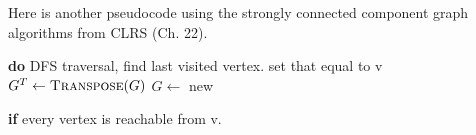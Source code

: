 \documentclass[letterpaper, 11pt]{article}
\begin{document}
\begin{algorithm}[]
    Here is another pseudocode using the strongly connected component graph algorithms from CLRS (Ch. 22).\newline
        \begin{algorithmic}[1]
                \State{} 
                \State{} \textbf{do} DFS traversal, find last visited vertex. 
                \State{} \indent set that equal to v
                \State{} $G^T \gets \Call{Transpose}{G}$
                \State{} 
                \State{} $G \gets$ new 
                \State{} 
            \EndFunction{}
        \end{algorithmic}
    \end{algorithm}
    
\begin{algorithm}[]
        \begin{algorithmic}[1]
                \State{} 
                \State{} \textbf{if} every vertex is reachable from v. 
                \State{} \indent {}
            \EndFunction{}
        \end{algorithmic}
    \end{algorithm}
\end{document}
